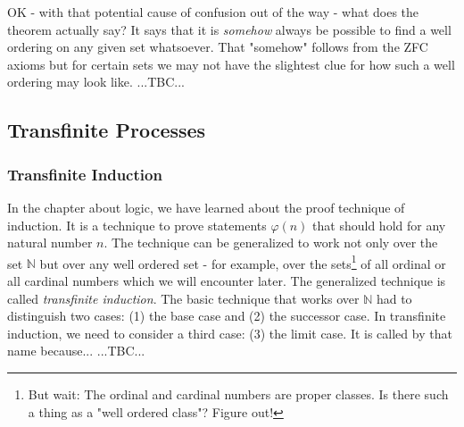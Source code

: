 \medskip
OK - with that potential cause of confusion out of the way - what does the theorem actually say? It says that it is \emph{somehow} always be possible to find a well ordering on any given set whatsoever. That "somehow" follows from the ZFC axioms but for certain sets we may not have the slightest clue for how such a well ordering may look like. ...TBC...








\subsection{Transfinite Processes}

\subsubsection{Transfinite Induction}
In the chapter about logic, we have learned about the proof technique of induction. It is a technique to prove statements $\varphi(n)$ that should hold for any natural number $n$. The technique can be generalized to work not only over the set $\mathbb{N}$ but over any well ordered set - for example, over the sets\footnote{But wait: The ordinal and cardinal numbers are proper classes. Is there such a thing as a "well ordered class"? Figure out!} of all ordinal or all cardinal numbers which we will encounter later. The generalized technique is called \emph{transfinite induction}. The basic technique that works over $\mathbb{N}$ had to distinguish two cases: (1) the base case and (2) the successor case. In transfinite induction, we need to consider a third case: (3) the limit case. It is called by that name because... ...TBC...


